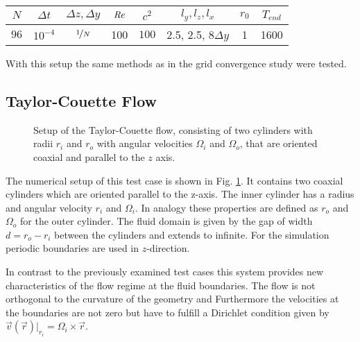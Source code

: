 \begin{center}
\vspace*{0.7ex}
\begin{tabular}{c|c|c|c|c|c|c|c }
 $ N  $                   & $\Delta t$ & $\Delta z, \Delta y$            & $\mbox{\textit{Re}}$  & $c^2$   & $l_y, l_z, l_x $ &$r_0$ & $T_{end}$\\
\hline
 $96 $& $10^{-4}$ & $\nicefrac{1}{N}$ & 100     & $100$   & 2.5, 2.5, $8\Delta y $ & 1     & 1600\\
\end{tabular}
\vspace*{0.7ex}
\end{center}

With this setup the same methods as in the grid convergence study were tested.

\subsection{Taylor-Couette Flow}

\begin{figure}[!bp]
  \begin{minipage}[c]{0.6\textwidth}
      \centering
  \end{minipage}
  \begin{minipage}[c]{0.3\textwidth}
      \caption{Setup of the Taylor-Couette flow, consisting of  two cylinders with radii $r_i$ and $r_o$ with angular velocities $\Omega_i$ and $\Omega_o$, that are oriented coaxial
       and parallel to the $z$ axis.
      \label{validation:setup_tcflow}
      }
  \end{minipage}
\end{figure}

The numerical setup of this test case is shown in Fig. \ref{validation:setup_tcflow}.
It contains two coaxial cylinders which are oriented parallel to the z-axis.
The inner cylinder has a radius and angular velocity $r_i$ and $\Omega_i$. In analogy these properties are defined as
$r_o$ and $\Omega_o$ for the outer cylinder.
The fluid domain is given by the gap of width $d = r_o - r_i$ between the cylinders and extends to infinite.
For the simulation  periodic boundaries are used in $z$-direction.

In contrast to the previously examined test cases this system provides new characteristics
of the flow regime at the fluid boundaries. The flow is not orthogonal to the curvature of the geometry and
Furthermore the velocities at the boundaries are not zero but have to fulfill  a Dirichlet condition given by
$\vec{v}(\vec{r})|_{r_i}  = \Omega_i \times \vec{r}$.

